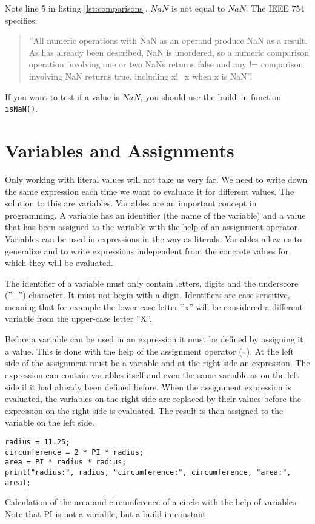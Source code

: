 Note line 5 in listing \ref{lst:comparisons}. $NaN$ is not equal to $NaN$. The IEEE 754\cite{_754-2008_2008} specifies: 
\begin{quotation}
 ''All numeric operations with NaN as an operand produce NaN as a result. As has already been described, NaN is unordered, so a numeric comparison operation involving one or two NaNs returns false and any != comparison involving NaN returns true, including x!=x when x is NaN''.
\end{quotation}

If you want to test if a value is $NaN$, you should use the build--in function {\tt isNaN()}.

\section{Variables and Assignments}

Only working with literal values will not take us very far. We need to write down the same expression each time we want to evaluate it for different values. The solution to this are variables. Variables are an important concept in programming. A variable has an identifier (the name of the variable) and a value that has been assigned to the variable with the help of an assignment operator. Variables can be used in expressions in the way as literals. Variables allow us to generalize and to write expressions independent from the concrete values for which they will be evaluated.

The identifier of a variable must only contain letters, digits and the underscore (''\_'') character. It must not begin with a digit. Identifiers are case-sensitive, meaning that for example the lower-case letter ''x'' will be considered a different variable from the upper-case letter ''X''.

Before a variable can be used in an expression it must be defined by assigning it a value. This is done with the help of the assignment operator ({\tt =}). At the left side of the assignment must be a variable and at the right side an expression. The expression can contain variables itself and even the same variable as on the left side if it had already been defined before. When the assignment expression is evaluated, the variables on the right side are replaced by their values before the expression on the right side is evaluated. The result is then assigned to the variable on the left side.

\begin{listing}[H]
\begin{verbatim}
radius = 11.25;
circumference = 2 * PI * radius;
area = PI * radius * radius;
print("radius:", radius, "circumference:", circumference, "area:", area);
\end{verbatim}
\caption{Calculation of the area and circumference of a circle with the help of variables. Note that PI is not a variable, but a build in constant.}
\label{lst:circle_with_variables}
\end{listing}

